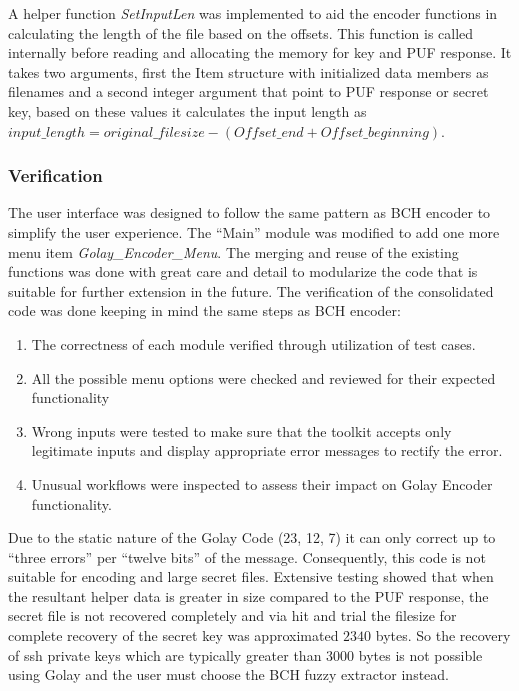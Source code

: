 	\vspace*{1\baselineskip}
	A helper function \emph{SetInputLen} was implemented to aid the encoder functions in calculating the length of the file based on the offsets. This function is called internally before reading and allocating the memory for key and PUF response. It takes two arguments, first the Item structure with initialized data members as filenames and a second integer argument that point to PUF response or secret key, based on these values it calculates the input length as $input\_length =
	original\_filesize - (Offset\_end + Offset\_beginning)$. \\

	\subsubsection{Verification}
	The user interface was designed to follow the same pattern as BCH encoder to simplify the user experience. The ``Main'' module was modified to add one more menu item \emph{Golay\_Encoder\_Menu}. The merging and reuse of the existing functions was done with great care and detail to modularize the code that is suitable for further extension in the future. The verification of the consolidated code was done keeping in mind the same steps as BCH encoder:
	\begin{enumerate}
		\item The correctness of each module verified through utilization of test cases.
		\item All the possible menu options were checked and reviewed for their expected functionality
		\item Wrong inputs were tested to make sure that the toolkit accepts only legitimate inputs and display appropriate error messages to rectify the error.
		\item Unusual workflows were inspected to assess their impact on Golay Encoder functionality.
	\end{enumerate}

	Due to the static nature of the Golay Code (23, 12, 7) it can only correct up to ``three errors'' per ``twelve bits'' of the message. Consequently, this code is not suitable for encoding and large secret files. Extensive testing showed that when the resultant helper data is greater in size compared to the PUF response, the secret file is not recovered completely and via hit and trial the filesize for complete recovery of the secret key was approximated $2340$ bytes. So the recovery of ssh private keys which are
	typically greater than 3000 bytes is not possible using Golay and the user must choose the BCH fuzzy extractor instead.

